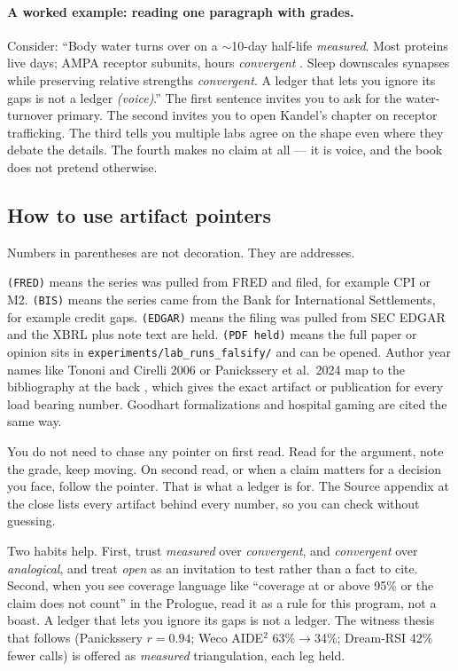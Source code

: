 \paragraph{A worked example: reading one paragraph with grades.} 
Consider: ``Body water turns over on a $\sim$10-day half-life \textit{measured}. Most proteins live days; AMPA receptor subunits, hours \textit{convergent} \citep{kandel2000}. Sleep downscales synapses while preserving relative strengths \textit{convergent}. A ledger that lets you ignore its gaps is not a ledger \textit{(voice)}.'' The first sentence invites you to ask for the water-turnover primary. The second invites you to open Kandel's chapter on receptor trafficking. The third tells you multiple labs agree on the shape even where they debate the details. The fourth makes no claim at all --- it is voice, and the book does not pretend otherwise.

\subsection*{How to use artifact pointers}

Numbers in parentheses are not decoration. They are addresses.

\texttt{(FRED)} means the series was pulled from FRED and filed, for example CPI or M2. \texttt{(BIS)} means the series came from the Bank for International Settlements, for example credit gaps. \texttt{(EDGAR)} means the filing was pulled from SEC EDGAR and the XBRL plus note text are held. \texttt{(PDF held)} means the full paper or opinion sits in \texttt{experiments/lab\_runs\_falsify/} and can be opened. Author year names like Tononi and Cirelli 2006 or Panickssery et al.\ 2024 map to the bibliography at the back \citep{panickssery2024,shumailov2024}, which gives the exact artifact or publication for every load bearing number. Goodhart formalizations \citep{goodhart2410,goodhart2505} and hospital gaming \citep{bevan2006} are cited the same way.

You do not need to chase any pointer on first read. Read for the argument, note the grade, keep moving. On second read, or when a claim matters for a decision you face, follow the pointer. That is what a ledger is for. The Source appendix at the close lists every artifact behind every number, so you can check without guessing.

Two habits help. First, trust \textit{measured} over \textit{convergent}, and \textit{convergent} over \textit{analogical}, and treat \textit{open} as an invitation to test rather than a fact to cite. Second, when you see coverage language like ``coverage at or above 95\% or the claim does not count'' in the Prologue, read it as a rule for this program, not a boast. A ledger that lets you ignore its gaps is not a ledger. The witness thesis that follows (Panickssery $r=0.94$; Weco AIDE$^2$ 63\%$\to$34\%; Dream-RSI 42\% fewer calls) is offered as \textit{measured} triangulation, each leg held.

